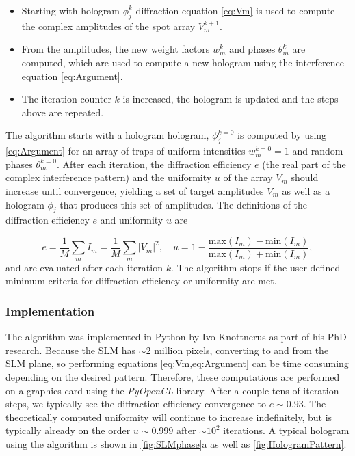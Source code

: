 \begin{itemize}
    \item Starting with hologram $\phi_j^k$ diffraction equation \cref{eq:Vm} is used to compute the complex amplitudes of the spot array $V_m^{k+1}$. 
    
    \item From the amplitudes, the new weight factors $w_m^k$ and phases $\theta_m^k$ are computed, which are used to compute a new hologram using the interference equation \cref{eq:Argument}.
    
    \item The iteration counter $k$ is increased, the hologram is updated and the steps above are repeated.
\end{itemize}
The algorithm starts with a hologram hologram, $\phi_j^{k=0}$ is computed by using \cref{eq:Argument} for an array of traps of uniform intensities $w_m^{k=0} = 1$ and random phases $\theta_m^{k=0}$.
After each iteration, the diffraction efficiency $e$ (the real part of the complex interference pattern) and the uniformity $u$ of the array $V_m$ should increase until convergence, yielding a set of target amplitudes $V_m$ as well as a hologram $\phi_j$ that produces this set of amplitudes.
The definitions of the diffraction efficiency $e$ and uniformity $u$ are 

\begin{equation}\label{eq:EfficiencyUniformity}
    e = \frac{1}{M}\sum_m I_m = \frac{1}{M}\sum_m |V_m|^2, 
    \quad 
    u = 1-\frac{\text{max}(I_m)-\text{min}(I_m)}{\text{max}(I_m)+\text{min}(I_m)},
\end{equation}
and are evaluated after each iteration $k$. 
The algorithm stops if the user-defined minimum criteria for diffraction efficiency or uniformity are met.

\subsubsection*{Implementation}

The algorithm was implemented in Python by Ivo Knottnerus as part of his PhD research.
Because the SLM has $\sim 2$ million pixels, converting to and from the SLM plane, so performing equations \cref{eq:Vm,eq:Argument} can be time consuming depending on the desired pattern.
Therefore, these computations are performed on a graphics card using the \textit{PyOpenCL} library. 
After a couple tens of iteration steps, we typically see the diffraction efficiency convergence to $e \sim 0.93$.
The theoretically computed uniformity will continue to increase indefinitely, but is typically already on the order $u \sim 0.999$ after $\sim 10^2$ iterations.
A typical hologram using the algorithm is shown in \ref{fig:SLMphase}a as well as \ref{fig:HologramPattern}.



